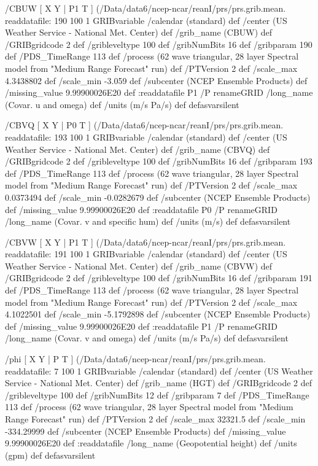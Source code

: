 \begin{ingrid}
  /CBUW { [ X Y | P1 T ] (/Data/data6/ncep-ncar/reanI/prs/prs.grib.mean.%
  readdatafile:
  190 100 1 GRIBvariable
  /calendar (standard) def
  /center (US Weather Service - National Met. Center) def
  /grib_name (CBUW) def
  /GRIBgridcode 2 def
  /gribleveltype 100 def
  /gribNumBits 16 def
  /gribparam 190 def
  /PDS_TimeRange 113 def
  /process (62 wave triangular, 28 layer Spectral model from "Medium Range Forecast" run) def
  /PTVersion 2 def
  /scale_max 4.3438802 def
  /scale_min -3.059 def
  /subcenter (NCEP Ensemble Products) def
  /missing_value 9.99900026E20 def
  :readdatafile
  P1 /P renameGRID
  /long_name (Covar. u and omega) def
  /units (m/s Pa/s) def
  } defasvarsilent
 
  /CBVQ { [ X Y | P0 T ] (/Data/data6/ncep-ncar/reanI/prs/prs.grib.mean.%
  readdatafile:
  193 100 1 GRIBvariable
  /calendar (standard) def
  /center (US Weather Service - National Met. Center) def
  /grib_name (CBVQ) def
  /GRIBgridcode 2 def
  /gribleveltype 100 def
  /gribNumBits 16 def
  /gribparam 193 def
  /PDS_TimeRange 113 def
  /process (62 wave triangular, 28 layer Spectral model from "Medium Range Forecast" run) def
  /PTVersion 2 def
  /scale_max 0.0373494 def
  /scale_min -0.0282679 def
  /subcenter (NCEP Ensemble Products) def
  /missing_value 9.99900026E20 def
  :readdatafile
  P0 /P renameGRID
  /long_name (Covar. v and specific hum) def
  /units (m/s) def
  } defasvarsilent 

  /CBVW { [ X Y | P1 T ] (/Data/data6/ncep-ncar/reanI/prs/prs.grib.mean.%
  readdatafile:
  191 100 1 GRIBvariable
  /calendar (standard) def
  /center (US Weather Service - National Met. Center) def
  /grib_name (CBVW) def
  /GRIBgridcode 2 def
  /gribleveltype 100 def
  /gribNumBits 16 def
  /gribparam 191 def
  /PDS_TimeRange 113 def
  /process (62 wave triangular, 28 layer Spectral model from "Medium Range Forecast" run) def
  /PTVersion 2 def
  /scale_max 4.1022501 def
  /scale_min -5.1792898 def
  /subcenter (NCEP Ensemble Products) def
  /missing_value 9.99900026E20 def
  :readdatafile
  P1 /P renameGRID
  /long_name (Covar. v and omega) def
  /units (m/s Pa/s) def
  } defasvarsilent

  /phi { [ X Y | P T ] (/Data/data6/ncep-ncar/reanI/prs/prs.grib.mean.%
  readdatafile:
  7 100 1 GRIBvariable
  /calendar (standard) def
  /center (US Weather Service - National Met. Center) def
  /grib_name (HGT) def
  /GRIBgridcode 2 def
  /gribleveltype 100 def
  /gribNumBits 12 def
  /gribparam 7 def
  /PDS_TimeRange 113 def
  /process (62 wave triangular, 28 layer Spectral model from "Medium Range Forecast" run) def
  /PTVersion 2 def
  /scale_max 32321.5 def
  /scale_min -334.29999 def
  /subcenter (NCEP Ensemble Products) def
  /missing_value 9.99900026E20 def
  :readdatafile
  /long_name (Geopotential height) def
  /units (gpm) def
  } defasvarsilent


\end{ingrid}
